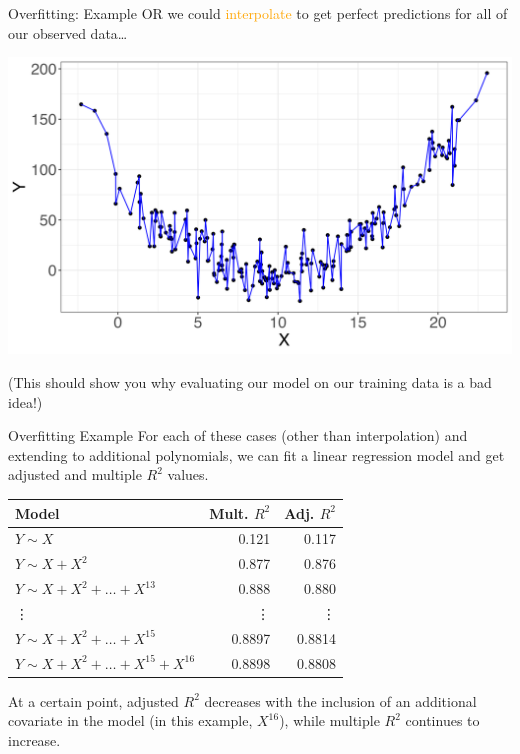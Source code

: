 \documentclass[10pt,t]{beamer}
\begin{document}
\begin{frame}{Overfitting: Example}
OR we could \textcolor{orange}{interpolate} to get perfect predictions for all of our observed data\dots

\vspace{0.3cm}

\begin{center}
	 \includegraphics[scale=0.4]{overfit5.png}
\end{center}
\begin{footnotesize}
	\vspace{-0.1cm}
(This should show you why evaluating our model on our training data is a bad idea!)
\end{footnotesize}
\end{frame}

\begin{frame}{Overfitting Example}
For each of these cases (other than interpolation) and extending to additional polynomials, we can fit a linear regression model and get adjusted and multiple $R^2$ values.

\vspace{0.3cm}

\begin{table}
	\begin{tabular}{l|r|r}

Model & Mult. $R^2$ & Adj. $R^2$ \\
\hline
$Y \sim X$ & 0.121 & 0.117\\
\hline
$Y \sim X + X^2$ & 0.877 & 0.876\\
\hline
$Y \sim X + X^2 + \dots + X^{13}$ & 0.888 & 0.880 \\
\hline
\vdots & \vdots & \vdots \\
\hline
$Y \sim X + X^2 + \dots + X^{15}$ & 0.8897 & 0.8814 \\
\hline
$Y \sim X + X^2 + \dots + X^{15} + X^{16}$ & 0.8898 & 0.8808
\end{tabular}
\end{table}

\vspace{0.3cm} At a certain point, adjusted $R^2$ decreases with the inclusion of an additional covariate in the model (in this example, $X^{16}$), while multiple $R^2$ continues to increase.
	
\end{frame}
\end{document}
